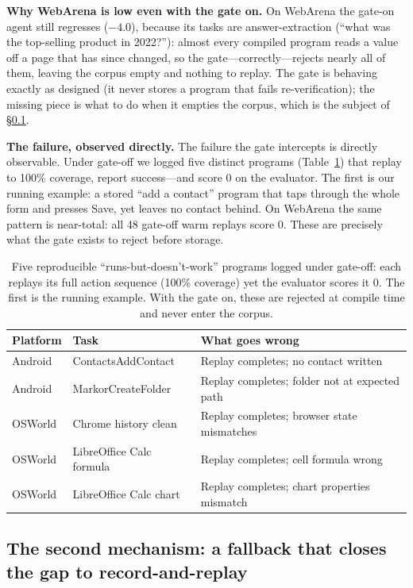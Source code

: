 \documentclass[11pt]{article}
\begin{document}
\textbf{Why WebArena is low even with the gate on.} On WebArena the gate-on agent still regresses ($-4.0$), because its tasks are answer-extraction (``what was the top-selling product in 2022?''): almost every compiled program reads a value off a page that has since changed, so the gate---correctly---rejects nearly all of them, leaving the corpus empty and nothing to replay. The gate is behaving exactly as designed (it never stores a program that fails re-verification); the missing piece is what to do when it empties the corpus, which is the subject of \S\ref{sec:eval-baselines}.

\textbf{The failure, observed directly.} The failure the gate intercepts is directly observable. Under gate-off we logged five distinct programs (Table~\ref{tab:smoking-gun}) that replay to 100\% coverage, report success---and score 0 on the evaluator. The first is our running example: a stored ``add a contact'' program that taps through the whole form and presses Save, yet leaves no contact behind. On WebArena the same pattern is near-total: all 48 gate-off warm replays score 0. These are precisely what the gate exists to reject before storage.

\begin{table}[t]
\centering
\caption{Five reproducible ``runs-but-doesn't-work'' programs logged under gate-off: each replays its full action sequence (100\% coverage) yet the evaluator scores it 0. The first is the running example. With the gate on, these are rejected at compile time and never enter the corpus.}
\label{tab:smoking-gun}
\small
\begin{tabular}{@{}lll@{}}
\toprule
Platform & Task & What goes wrong \\
\midrule
Android & ContactsAddContact & Replay completes; no contact written \\
Android & MarkorCreateFolder & Replay completes; folder not at expected path \\
OSWorld & Chrome history clean & Replay completes; browser state mismatches \\
OSWorld & LibreOffice Calc formula & Replay completes; cell formula wrong \\
OSWorld & LibreOffice Calc chart & Replay completes; chart properties mismatch \\
\bottomrule
\end{tabular}
\end{table}

\subsection{The second mechanism: a fallback that closes the gap to record-and-replay}
\label{sec:eval-baselines}
\end{document}
